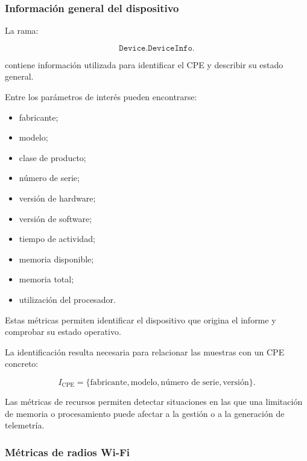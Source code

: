 \subsubsection*{Información general del dispositivo}

La rama:

\[
    \texttt{Device.DeviceInfo.}
\]

contiene información utilizada para identificar el CPE y describir su
estado general.

Entre los parámetros de interés pueden encontrarse:

\begin{itemize}
    \item fabricante;

    \item modelo;

    \item clase de producto;

    \item número de serie;

    \item versión de hardware;

    \item versión de software;

    \item tiempo de actividad;

    \item memoria disponible;

    \item memoria total;

    \item utilización del procesador.
\end{itemize}

Estas métricas permiten identificar el dispositivo que origina el
informe y comprobar su estado operativo.

La identificación resulta necesaria para relacionar las muestras con un
CPE concreto:

\[
    I_{\mathrm{CPE}}
    =
    \{
        \text{fabricante},
        \text{modelo},
        \text{número de serie},
        \text{versión}
    \}.
\]

Las métricas de recursos permiten detectar situaciones en las que una
limitación de memoria o procesamiento puede afectar a la gestión o a la
generación de telemetría.


\subsubsection*{Métricas de radios Wi-Fi}

